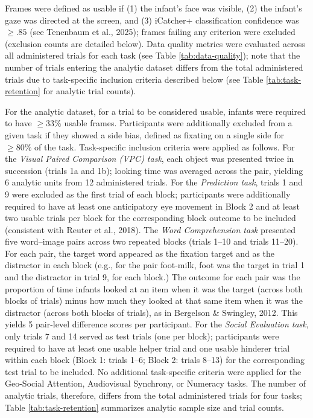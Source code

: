 \documentclass[
  english,
  man,floatsintext]{apa6}
\begin{document}
Frames were defined as usable if (1) the infant's face was visible, (2) the infant's gaze was directed at the screen, and (3) iCatcher+ classification confidence was \(\geq .85\) (see Tenenbaum et al., 2025); frames failing any criterion were excluded (exclusion counts are detailed below).
Data quality metrics were evaluated across all administered trials for each task (see Table \ref{tab:data-quality}); note that the number of trials entering the analytic dataset differs from the total administered trials due to task-specific inclusion criteria described below (see Table \ref{tab:task-retention} for analytic trial counts).

For the analytic dataset, for a trial to be considered usable, infants were required to have \(\geq 33\%\) usable frames.
Participants were additionally excluded from a given task if they showed a side bias, defined as fixating on a single side for \(\geq 80\%\) of the task.
Task-specific inclusion criteria were applied as follows.
For the \emph{Visual Paired Comparison (VPC) task}, each object was presented twice in succession (trials 1a and 1b); looking time was averaged across the pair, yielding 6 analytic units from 12 administered trials.
For the \emph{Prediction task}, trials 1 and 9 were excluded as the first trial of each block; participants were additionally required to have at least one anticipatory eye movement in Block 2 and at least two usable trials per block for the corresponding block outcome to be included (consistent with Reuter et al., 2018).
The \emph{Word Comprehension task} presented five word--image pairs across two repeated blocks (trials 1--10 and trials 11--20).
For each pair, the target word appeared as the fixation target and as the distractor in each block (e.g., for the pair foot-milk, foot was the target in trial 1 and the distractor in trial 9, for each block.) The outcome for each pair was the proportion of time infants looked at an item when it was the target (across both blocks of trials) minus how much they looked at that same item when it was the distractor (across both blocks of trials), as in Bergelson \& Swingley, 2012.
This yields 5 pair-level difference scores per participant.
For the \emph{Social Evaluation task}, only trials 7 and 14 served as test trials (one per block); participants were required to have at least one usable helper trial and one usable hinderer trial within each block (Block 1: trials 1--6; Block 2: trials 8--13) for the corresponding test trial to be included.
No additional task-specific criteria were applied for the Geo-Social Attention, Audiovisual Synchrony, or Numeracy tasks.
The number of analytic trials, therefore, differs from the total administered trials for four tasks; Table \ref{tab:task-retention} summarizes analytic sample size and trial counts.
\end{document}
